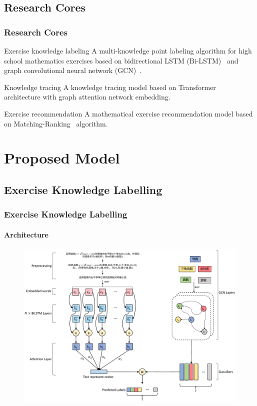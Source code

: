 \documentclass{beamer}
\begin{document}
\subsection{Research Cores}
\begin{frame}
  \frametitle{Research Cores}
  \begin{block}{Exercise knowledge labeling}
    A multi-knowledge point labeling algorithm for high school mathematics exercises based on bidirectional LSTM (Bi-LSTM)~\cite{chen2017improving} and graph convolutional neural network (GCN)~\cite{kipf2016semi}.
  \end{block}
  \begin{block}{Knowledge tracing}
    A knowledge tracing model based on Transformer~\cite{vaswani2017attention} architecture with graph attention network embedding.
  \end{block}
  \begin{block}{Exercise recommendation}
    A mathematical exercise recommendation model based on Matching-Ranking~\cite{segev2009context} algorithm.
  \end{block}
\end{frame}
\section{Proposed Model}
\subsection{Exercise Knowledge Labelling}
\begin{frame}
  \frametitle{Exercise Knowledge Labelling}
  \framesubtitle{Architecture}
  \begin{figure}
    \centering
    \includegraphics[height=0.80\textheight]{figures/ch2-ov.pdf}
  \end{figure}
\end{frame}
\end{document}
